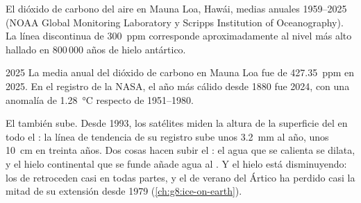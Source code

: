 \begin{omfigure}

{\small El dióxido de carbono del aire en Mauna Loa, Hawái, medias anuales
1959--2025 (NOAA Global Monitoring Laboratory y Scripps Institution of
Oceanography). La línea discontinua de \qty{300}{ppm} corresponde
aproximadamente al nivel más alto hallado en 800\,000 años de hielo
antártico.}
\label{fig:g9:climate-past-and-present:co2}
\end{omfigure}

\begin{dated}{2025}
La media anual del dióxido de carbono en Mauna Loa fue de
\qty{427.35}{ppm} en 2025. En el registro de la NASA, el año más cálido
desde 1880 fue 2024, con una anomalía de \qty{1.28}{\degreeCelsius}
respecto de 1951--1980.
\end{dated}

El  también sube. Desde 1993, los satélites miden la altura de la
superficie del  en todo el : la línea de tendencia de su registro
sube unos \qty{3.2}{mm} al año, unos \qty{10}{cm} en treinta años. Dos
cosas hacen subir el : el agua que se calienta se dilata, y el hielo
continental que se funde añade agua al . Y el hielo está
disminuyendo: los  de  retroceden casi en todas partes, y
el  de verano del Ártico ha perdido casi la mitad de su
extensión desde 1979 (\cref{ch:g8:ice-on-earth}).

